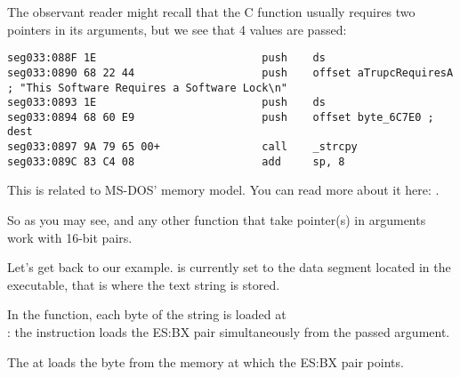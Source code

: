 
The observant reader might recall that the  C function usually requires two pointers in its arguments,
but we see that 4 values are passed:

\begin{lstlisting}
seg033:088F 1E                          push    ds
seg033:0890 68 22 44                    push    offset aTrupcRequiresA ; "This Software Requires a Software Lock\n"
seg033:0893 1E                          push    ds
seg033:0894 68 60 E9                    push    offset byte_6C7E0 ; dest
seg033:0897 9A 79 65 00+                call    _strcpy
seg033:089C 83 C4 08                    add     sp, 8
\end{lstlisting}

This is related to MS-DOS' memory model. You can read more about it here: 
.

So as you may see,  and any other function that take pointer(s) in arguments
work with 16-bit pairs.

Let's get back to our example.
 is currently set to the data segment located in the executable,
that is where the text string is stored.


In the  function, each byte of the string is loaded at\\
: the  instruction
loads the ES:BX pair simultaneously from the passed argument.

The \MOV at  loads the byte from the memory at which the ES:BX pair points.

%
%


